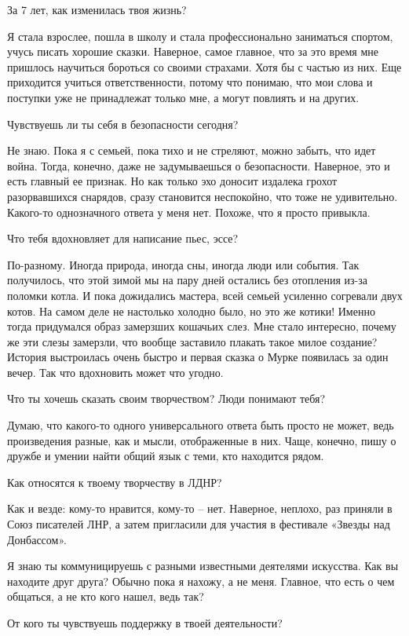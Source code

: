 За 7 лет, как изменилась твоя жизнь?

Я стала взрослее, пошла в школу и стала профессионально заниматься спортом,
учусь писать хорошие сказки. Наверное, самое главное, что за это время мне
пришлось научиться бороться со своими страхами. Хотя бы с частью из них. Еще
приходится учиться ответственности, потому что понимаю, что мои слова и
поступки уже не принадлежат только мне, а могут повлиять и на других.

Чувствуешь ли ты себя в безопасности сегодня?

Не знаю. Пока я с семьей, пока тихо и не стреляют, можно забыть, что идет
война. Тогда, конечно, даже не задумываешься о безопасности. Наверное, это и
есть главный ее признак. Но как только эхо доносит издалека грохот
разорвавшихся снарядов, сразу становится неспокойно, что тоже не удивительно.
Какого-то однозначного ответа у меня нет. Похоже, что я просто привыкла.

Что тебя вдохновляет для написание пьес, эссе?

По-разному. Иногда природа, иногда сны, иногда люди или события. Так
получилось, что этой зимой мы на пару дней остались без отопления из-за поломки
котла. И пока дожидались мастера, всей семьей усиленно согревали двух котов. На
самом деле не настолько холодно было, но это же котики! Именно тогда придумался
образ замерзших кошачьих слез. Мне стало интересно, почему же эти слезы
замерзли, что вообще заставило плакать такое милое создание? История
выстроилась очень быстро и первая сказка о Мурке появилась за один вечер. Так
что вдохновить может что угодно.

Что ты хочешь сказать своим творчеством? Люди понимают тебя?

Думаю, что какого-то одного универсального ответа быть просто не может, ведь
произведения разные, как и мысли, отображенные в них. Чаще, конечно, пишу о
дружбе и умении найти общий язык с теми, кто находится рядом.

Как относятся к твоему творчеству в ЛДНР?

Как и везде: кому-то нравится, кому-то – нет. Наверное, неплохо, раз приняли в
Союз писателей ЛНР, а затем пригласили для участия в фестивале «Звезды над
Донбассом».

Я знаю ты коммуницируешь с разными известными деятелями искусства. Как вы находите друг друга?
Обычно пока я нахожу, а не меня. Главное, что есть о чем общаться, а не кто кого нашел, ведь так?

От кого ты чувствуешь поддержку в твоей деятельности?

